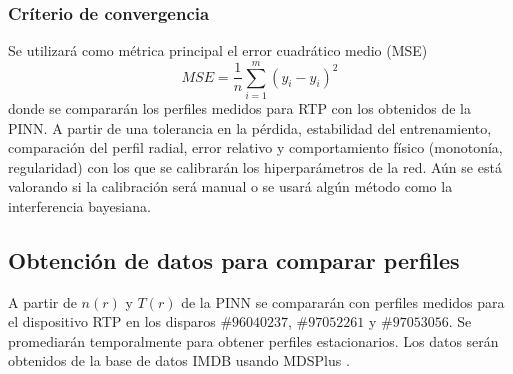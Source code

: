 \subsubsection{Críterio de convergencia}
\vspace{- 2 mm}
Se utilizará como métrica principal el error cuadrático medio (MSE)
\vspace{- 3 mm} 
\begin{equation}
MSE = \frac{1}{n}\sum\limits_{i = 1}^m(y_i - \hat{y}_i)^2
\end{equation}
donde se compararán los perfiles medidos para RTP con los obtenidos de la PINN. A partir de una tolerancia en la pérdida, estabilidad del entrenamiento, comparación del perfil radial, error relativo y comportamiento físico (monotonía, regularidad) con los que se calibrarán los hiperparámetros de la red. Aún se está valorando si la calibración será manual o se usará algún método como la interferencia bayesiana.
\vspace{- 5 mm}
\subsection{Obtención de datos para comparar perfiles}
A partir de $n(r)$ y $T(r)$ de la PINN se compararán con perfiles medidos para el dispositivo RTP en los disparos $\#96040237$, $\#97052261$ y $\#97053056$. Se promediarán temporalmente para obtener perfiles estacionarios. Los datos serán obtenidos de la base de datos IMDB \cite{roach2008} usando MDSPlus \cite{stillerman1997}.
\vspace{- 6 mm}
